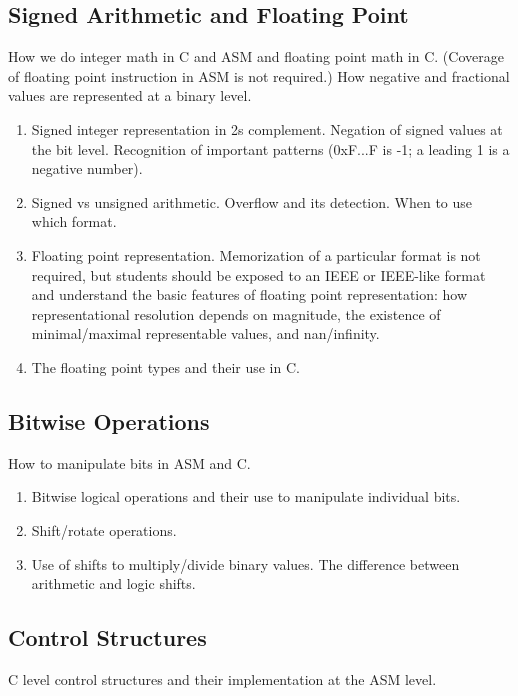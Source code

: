 \documentclass[12pt,letterpaper]{article}
\begin{document}
	\subsection{Signed Arithmetic and Floating Point}

	How we do integer math in C and ASM and floating point math in C. (Coverage of floating point instruction in ASM is not required.) How negative and fractional values are represented at a binary level. 

	\begin{enumerate}
		\item Signed integer representation in 2s complement. Negation of signed values at the bit level. Recognition of important patterns (0xF...F is -1; a leading 1 is a negative number).
		\item Signed vs unsigned arithmetic. Overflow and its detection. When to use which format.
		\item Floating point representation. Memorization of a particular format is not required, but students should be exposed to an IEEE or IEEE-like format and understand the basic features of floating point representation: how representational resolution depends on magnitude, the existence of minimal/maximal representable values, and nan/infinity.
		\item The floating point types and their use in C. 
	\end{enumerate}
	

	\subsection{Bitwise Operations}

	How to manipulate bits in ASM and C.

	\begin{enumerate}
		\item Bitwise logical operations and their use to manipulate individual bits.
		\item Shift/rotate operations.
		\item Use of shifts to multiply/divide binary values. The difference between arithmetic and logic shifts.
	\end{enumerate}
	

	\subsection{Control Structures}

	C level control structures and their implementation at the ASM level.
\end{document}
